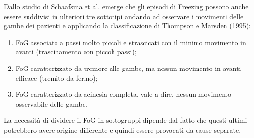 Dallo studio di Schaafsma et al.\cite{30} emerge che gli episodi di Freezing possono anche essere suddivisi in ulteriori tre sottotipi andando ad osservare i movimenti delle gambe dei pazienti e applicando la classificazione di Thompson e Marsden (1995):
\begin{enumerate}
	\item FoG associato a passi molto piccoli e strascicati con il minimo movimento in avanti (trascinamento con piccoli passi);
	\item FoG caratterizzato da tremore alle gambe, ma nessun movimento in avanti efficace (tremito da fermo);
	\item FoG caratterizzato da acinesia completa, vale a dire, nessun movimento osservabile delle gambe.
\end{enumerate}
La necessità di dividere il FoG in sottogruppi dipende dal fatto che questi ultimi potrebbero avere origine differente e quindi essere provocati da cause separate.
